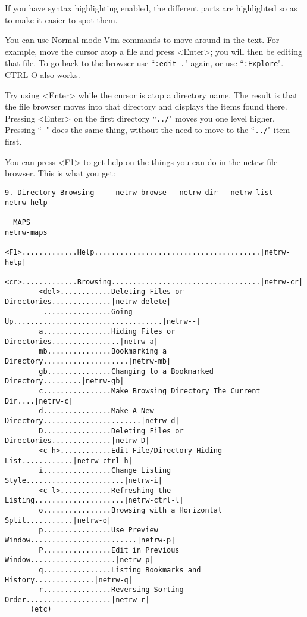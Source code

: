 If you have syntax highlighting enabled, the different parts are highlighted so as to make it easier to spot them.

You can use Normal mode Vim commands to move around in the text.
For example, move the cursor atop a file and press <Enter>; you will then be editing that file.
To go back to the browser use ``\texttt{:edit .}" again, or use ``\texttt{:Explore}".
CTRL-O also works.

Try using <Enter> while the cursor is atop a directory name.
The result is that the file browser moves into that directory and displays the items found there.
Pressing <Enter> on the first directory ``\texttt{../}" moves you one level higher.
Pressing ``\texttt{-}" does the same thing, without the need to move to the ``\texttt{../}" item first.

You can press <F1> to get help on the things you can do in the netrw file browser.
This is what you get:
\begin{Verbatim}[samepage=true]
  9. Directory Browsing     netrw-browse   netrw-dir   netrw-list   netrw-help 

  MAPS                                                                  netrw-maps 
        <F1>.............Help.......................................|netrw-help|
        <cr>.............Browsing...................................|netrw-cr|
        <del>............Deleting Files or Directories..............|netrw-delete|
        -................Going Up...................................|netrw--|
        a................Hiding Files or Directories................|netrw-a|
        mb...............Bookmarking a Directory....................|netrw-mb|
        gb...............Changing to a Bookmarked Directory.........|netrw-gb|
        c................Make Browsing Directory The Current Dir....|netrw-c|
        d................Make A New Directory.......................|netrw-d|
        D................Deleting Files or Directories..............|netrw-D|
        <c-h>............Edit File/Directory Hiding List............|netrw-ctrl-h|
        i................Change Listing Style.......................|netrw-i|
        <c-l>............Refreshing the Listing.....................|netrw-ctrl-l|
        o................Browsing with a Horizontal Split...........|netrw-o|
        p................Use Preview Window.........................|netrw-p|
        P................Edit in Previous Window....................|netrw-p|
        q................Listing Bookmarks and History..............|netrw-q|
        r................Reversing Sorting Order....................|netrw-r|
      (etc)
\end{Verbatim}

